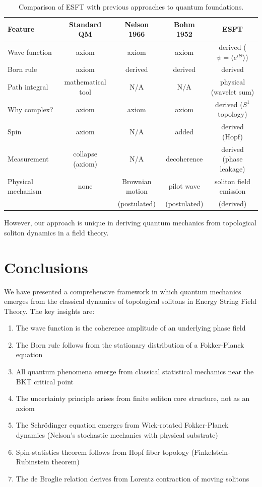 ﻿\documentclass[twocolumn,showpacs,preprintnumbers,amsmath,amssymb,prd]{revtex4-2}
\begin{document}
\begin{table}[htb]
\centering
\begin{tabular}{|l|c|c|c|c|}
\hline
\textbf{Feature} & \textbf{Standard QM} & \textbf{Nelson 1966} & \textbf{Bohm 1952} & \textbf{ESFT} \\
\hline
Wave function & axiom & axiom & axiom & derived ($\psi = \langle e^{i\Theta}\rangle$) \\
Born rule & axiom & derived & derived & derived \\
Path integral & mathematical tool & N/A & N/A & physical (wavelet sum) \\
Why complex? & axiom & axiom & axiom & derived ($S^1$ topology) \\
Spin & axiom & N/A & added & derived (Hopf) \\
Measurement & collapse (axiom) & N/A & decoherence & derived (phase leakage) \\
Physical mechanism & none & Brownian motion & pilot wave & soliton field emission \\
 & & (postulated) & (postulated) & (derived) \\
\hline
\end{tabular}
\caption{Comparison of ESFT with previous approaches to quantum foundations.}
\label{tab:comparison}
\end{table}

However, our approach is unique in deriving quantum mechanics from topological soliton dynamics in a field theory.

\section{Conclusions}

We have presented a comprehensive framework in which quantum mechanics emerges from the classical dynamics of topological solitons in Energy String Field Theory. The key insights are:

\begin{enumerate}
\item The wave function is the coherence amplitude of an underlying phase field
\item The Born rule follows from the stationary distribution of a Fokker-Planck equation
\item All quantum phenomena emerge from classical statistical mechanics near the BKT critical point
\item The uncertainty principle arises from finite soliton core structure, not as an axiom
\item The Schrödinger equation emerges from Wick-rotated Fokker-Planck dynamics (Nelson's stochastic mechanics with physical substrate)
\item Spin-statistics theorem follows from Hopf fiber topology (Finkelstein-Rubinstein theorem)
\item The de Broglie relation derives from Lorentz contraction of moving solitons
\end{enumerate}
\end{document}
